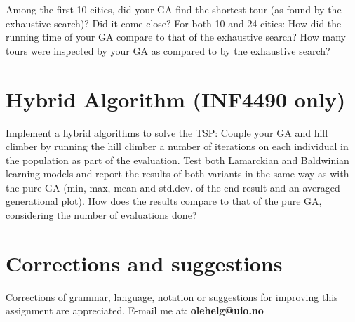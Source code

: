 \documentclass{article}           %
\begin{document}
Among the first 10 cities, did your GA find the shortest tour (as found by the
exhaustive search)? Did it come close? For both 10 and 24 cities: How did the
running time of your GA compare to that of the exhaustive search? How many
tours were inspected by your GA as compared to by the exhaustive search?

\section*{Hybrid Algorithm (INF4490 only)}
Implement a hybrid algorithms to solve the TSP: Couple your GA and hill
climber by running the hill climber a number of iterations on each individual
in the population as part of the evaluation. Test both Lamarckian and
Baldwinian learning models and report the results of both variants in the same
way as with the pure GA (min, max, mean and std.dev. of the end result and an
averaged generational plot). How does the results compare to that of the pure
GA, considering the number of evaluations done?

\section*{Corrections and suggestions}
Corrections of grammar, language, notation or suggestions for improving this
assignment are appreciated. E-mail me at: \textbf{olehelg@uio.no}
\end{document}
